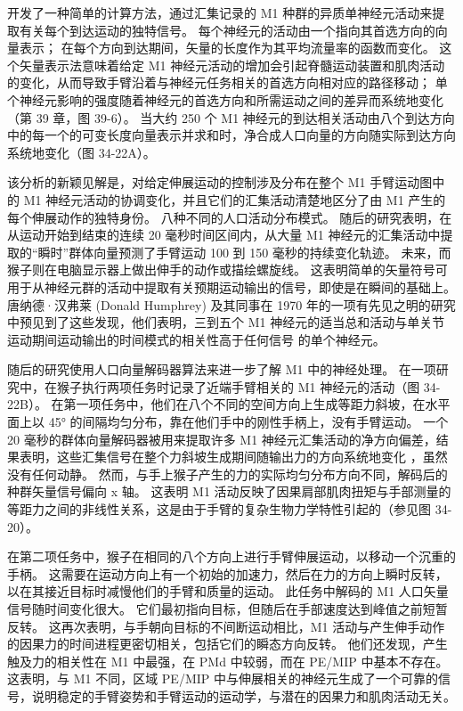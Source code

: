 开发了一种简单的计算方法，通过汇集记录的 M1 种群的异质单神经元活动来提取有关每个到达运动的独特信号。 每个神经元的活动由一个指向其首选方向的向量表示； 在每个方向到达期间，矢量的长度作为其平均流量率的函数而变化。 这个矢量表示法意味着给定 M1 神经元活动的增加会引起脊髓运动装置和肌肉活动的变化，从而导致手臂沿着与神经元任务相关的首选方向相对应的路径移动； 单个神经元影响的强度随着神经元的首选方向和所需运动之间的差异而系统地变化（第 39 章，图 39-6）。 当大约 250 个 M1 神经元的到达相关活动由八个到达方向中的每一个的可变长度向量表示并求和时，净合成人口向量的方向随实际到达方向系统地变化（图 34-22A）。

该分析的新颖见解是，对给定伸展运动的控制涉及分布在整个 M1 手臂运动图中的 M1 神经元活动的协调变化，并且它们的汇集活动清楚地区分了由 M1 产生的每个伸展动作的独特身份。 八种不同的人口活动分布模式。 随后的研究表明，在从运动开始到结束的连续 20 毫秒时间区间内，从大量 M1 神经元的汇集活动中提取的“瞬时”群体向量预测了手臂运动 100 到 150 毫秒的持续变化轨迹。 未来，而猴子则在电脑显示器上做出伸手的动作或描绘螺旋线。 这表明简单的矢量符号可用于从神经元群的活动中提取有关预期运动输出的信号，即使是在瞬间的基础上。 唐纳德·汉弗莱 (Donald Humphrey) 及其同事在 1970 年的一项有先见之明的研究中预见到了这些发现，他们表明，三到五个 M1 神经元的适当总和活动与单关节运动期间运动输出的时间模式的相关性高于任何信号 的单个神经元。

随后的研究使用人口向量解码器算法来进一步了解 M1 中的神经处理。 在一项研究中，在猴子执行两项任务时记录了近端手臂相关的 M1 神经元的活动（图 34-22B）。 在第一项任务中，他们在八个不同的空间方向上生成等距力斜坡，在水平面上以 45° 的间隔均匀分布，靠在他们手中的刚性手柄上，没有手臂运动。 一个 20 毫秒的群体向量解码器被用来提取许多 M1 神经元汇集活动的净方向偏差，结果表明，这些汇集信号在整个力斜坡生成期间随输出力的方向系统地变化 ，虽然没有任何动静。 然而，与手上猴子产生的力的实际均匀分布方向不同，解码后的种群矢量信号偏向 x 轴。 这表明 M1 活动反映了因果肩部肌肉扭矩与手部测量的等距力之间的非线性关系，这是由于手臂的复杂生物力学特性引起的（参见图 34-20）。

在第二项任务中，猴子在相同的八个方向上进行手臂伸展运动，以移动一个沉重的手柄。 这需要在运动方向上有一个初始的加速力，然后在力的方向上瞬时反转，以在其接近目标时减慢他们的手臂和质量的运动。 此任务中解码的 M1 人口矢量信号随时间变化很大。 它们最初指向目标，但随后在手部速度达到峰值之前短暂反转。 这再次表明，与手朝向目标的不间断运动相比，M1 活动与产生伸手动作的因果力的时间进程更密切相关，包括它们的瞬态方向反转。 他们还发现，产生触及力的相关性在 M1 中最强，在 PMd 中较弱，而在 PE/MIP 中基本不存在。 这表明，与 M1 不同，区域 PE/MIP 中与伸展相关的神经元生成了一个可靠的信号，说明稳定的手臂姿势和手臂运动的运动学，与潜在的因果力和肌肉活动无关。

